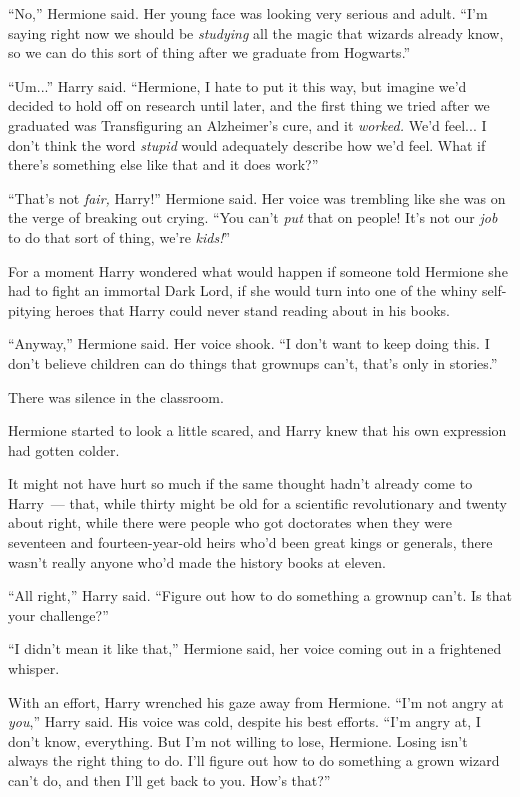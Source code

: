 ``No,'' Hermione said. Her young face was looking very serious and adult. ``I'm saying right now we should be \emph{studying} all the magic that wizards already know, so we can do this sort of thing after we graduate from Hogwarts.''

``Um...'' Harry said. ``Hermione, I hate to put it this way, but imagine we'd decided to hold off on research until later, and the first thing we tried after we graduated was Transfiguring an Alzheimer's cure, and it \emph{worked.} We'd feel... I don't think the word \emph{stupid} would adequately describe how we'd feel. What if there's something else like that and it does work?''

``That's not \emph{fair,} Harry!'' Hermione said. Her voice was trembling like she was on the verge of breaking out crying. ``You can't \emph{put} that on people! It's not our \emph{job} to do that sort of thing, we're \emph{kids!}''

For a moment Harry wondered what would happen if someone told Hermione she had to fight an immortal Dark Lord, if she would turn into one of the whiny self-pitying heroes that Harry could never stand reading about in his books.

``Anyway,'' Hermione said. Her voice shook. ``I don't want to keep doing this. I don't believe children can do things that grownups can't, that's only in stories.''

There was silence in the classroom.

Hermione started to look a little scared, and Harry knew that his own expression had gotten colder.

It might not have hurt so much if the same thought hadn't already come to Harry~--- that, while thirty might be old for a scientific revolutionary and twenty about right, while there were people who got doctorates when they were seventeen and fourteen-year-old heirs who'd been great kings or generals, there wasn't really anyone who'd made the history books at eleven.

``All right,'' Harry said. ``Figure out how to do something a grownup can't. Is that your challenge?''

``I didn't mean it like that,'' Hermione said, her voice coming out in a frightened whisper.

With an effort, Harry wrenched his gaze away from Hermione. ``I'm not angry at \emph{you},'' Harry said. His voice was cold, despite his best efforts. ``I'm angry at, I don't know, everything. But I'm not willing to lose, Hermione. Losing isn't always the right thing to do. I'll figure out how to do something a grown wizard can't do, and then I'll get back to you. How's that?''

